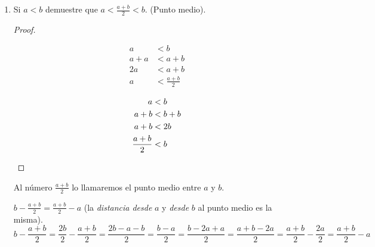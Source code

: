 \begin{enumerate}[label=\alph*)]
  \item Si $a<b$ demuestre que $a<\frac{a+b}{2}<b$. (Punto medio).
 \begin{proof} \leavevmode%
  \begin{center}\vspace{-2em}
  \begin{minipage}[r]{.4\linewidth}
  \begin{align*}
  a &< b \\
  a + a &< a+b \\
  2a &< a+b \\
  a &< \frac{a+b}{2}
  \end{align*}
  \end{minipage}%
  \begin{minipage}[l]{.4\linewidth}
  \begin{align*}
  a &< b \\
  a + b &< b+b \\
  a +b &< 2b \\
  \frac{a+b}{2} &< b \qedhere
  \end{align*}
  \end{minipage}%
  \end{center}%
 \end{proof}
 
   Al número $\frac{a+b}{2}$ lo llamaremos el punto medio entre $a$ y $b$.

  $b-\frac{a+b}{2} = \frac{a+b}{2}-a$ (la \textit{distancia desde} $a$ y \textit{desde} $b$ al punto medio es la misma).
 \[b-\frac{a+b}{2} = \frac{2b}{2}-\frac{a+b}{2} = \frac{2b-a-b}{2}= \frac{b-a}{2}= \frac{b-2a+a}{2}= \frac{a+b-2a}{2}= \frac{a+b}{2}-\frac{2a}{2} = \frac{a+b}{2}-a\]
 

\end{enumerate}
